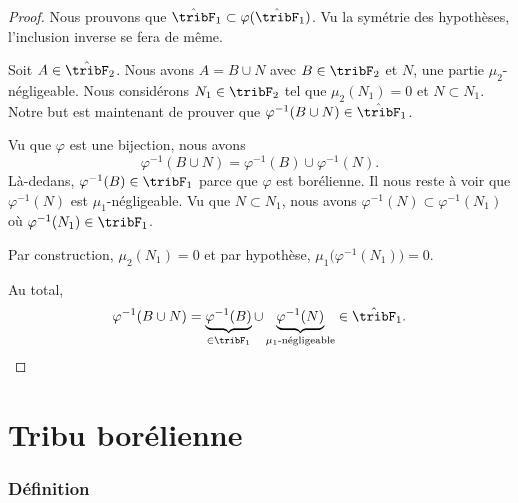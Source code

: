 \begin{proof}
    Nous prouvons que \( \hat\tribF_1\subset \varphi(\hat\tribF_1)\). Vu la symétrie des hypothèses, l'inclusion inverse se fera de même.

    Soit \( A\in\hat\tribF_2\). Nous avons \( A=B\cup N\) avec \( B\in \tribF_2\) et \( N\), une partie \( \mu_2\)-négligeable. Nous considérons \( N_1\in\tribF_2\) tel que \( \mu_2(N_1)=0\) et \( N\subset N_1\). Notre but est maintenant de prouver que \( \varphi^{-1}(B\cup N)\in \hat\tribF_1\). 

    Vu que \( \varphi\) est une bijection, nous avons
    \begin{equation}
        \varphi^{-1}(B\cup N)=\varphi^{-1}(B)\cup \varphi^{-1}(N).
    \end{equation}
    Là-dedans, \( \varphi^{-1}(B)\in \tribF_1\) parce que \( \varphi\) est borélienne. Il nous reste à voir que \( \varphi^{-1}(N)\) est \( \mu_1\)-négligeable. Vu que \( N\subset N_1\), nous avons \( \varphi^{-1}(N)\subset\varphi^{-1}(N_1)\) où \( \varphi^{-1}(N_1)\in\tribF_1\).

    Par construction, \( \mu_2(N_1)=0\) et par hypothèse, \( \mu_1\big( \varphi^{-1}(N_1) \big)=0\).

    Au total,
    \begin{equation}
        \varphi^{-1}(B\cup N)=\underbrace{\varphi^{-1}(B)}_{\in\tribF_1}\cup\underbrace{\varphi^{-1}(N)}_{\mu_1\text{-négligeable}}\in\hat\tribF_1.
    \end{equation}
\end{proof}

\section{Tribu borélienne}

\subsubsection{Définition}

